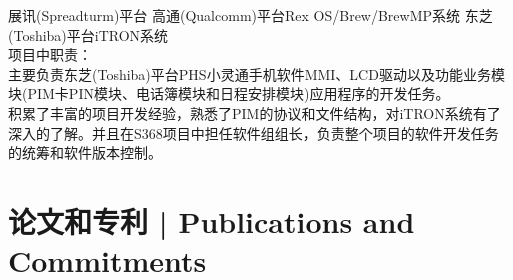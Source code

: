 \documentclass{resume}
\begin{document}

展讯(Spreadturm)平台 高通(Qualcomm)平台Rex OS/Brew/BrewMP系统 东芝(Toshiba)平台iTRON系统\\

项目中职责：\\
主要负责东芝(Toshiba)平台PHS小灵通手机软件MMI、LCD驱动以及功能业务模块(PIM卡PIN模块、电话簿模块和日程安排模块)应用程序的开发任务。\\
积累了丰富的项目开发经验，熟悉了PIM的协议和文件结构，对iTRON系统有了深入的了解。并且在S368项目中担任软件组组长，负责整个项目的软件开发任务的统筹和软件版本控制。

\spaceline{}













\begin{onehalfspacing}
\end{onehalfspacing}

\section{论文和专利 | Publications and Commitments}
\end{document}
